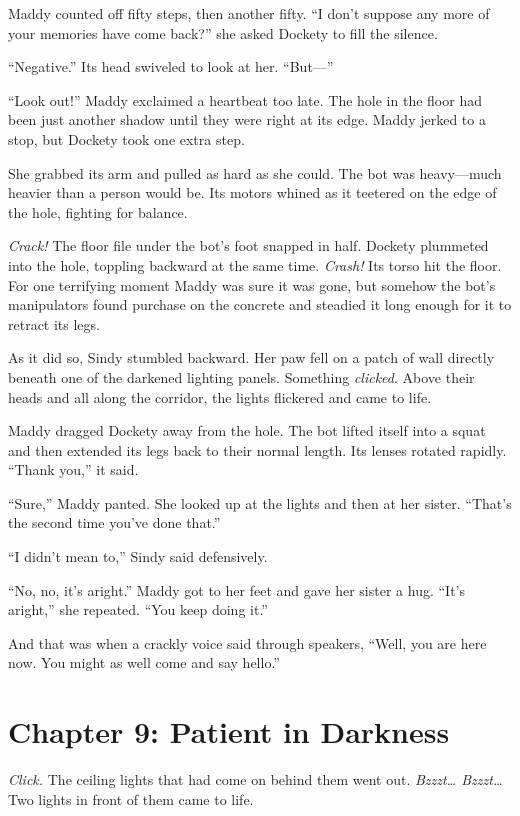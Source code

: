 \documentclass[10pt]{article}
\begin{document}
Maddy counted off fifty steps, then another fifty. ``I don't suppose any
more of your memories have come back?'' she asked Dockety to fill the
silence.

``Negative.'' Its head swiveled to look at her. ``But---''

``Look out!'' Maddy exclaimed a heartbeat too late. The hole in the
floor had been just another shadow until they were right at its edge.
Maddy jerked to a stop, but Dockety took one extra step.

She grabbed its arm and pulled as hard as she could. The bot was
heavy---much heavier than a person would be. Its motors whined as it
teetered on the edge of the hole, fighting for balance.

\emph{Crack!} The floor file under the bot's foot snapped in half.
Dockety plummeted into the hole, toppling backward at the same time.
\emph{Crash!} Its torso hit the floor. For one terrifying moment Maddy
was sure it was gone, but somehow the bot's manipulators found purchase
on the concrete and steadied it long enough for it to retract its legs.

As it did so, Sindy stumbled backward. Her paw fell on a patch of wall
directly beneath one of the darkened lighting panels. Something
\emph{clicked}. Above their heads and all along the corridor, the lights
flickered and came to life.

Maddy dragged Dockety away from the hole. The bot lifted itself into a
squat and then extended its legs back to their normal length. Its lenses
rotated rapidly. ``Thank you,'' it said.

``Sure,'' Maddy panted. She looked up at the lights and then at her
sister. ``That's the second time you've done that.''

``I didn't mean to,'' Sindy said defensively.

``No, no, it's aright.'' Maddy got to her feet and gave her sister a
hug. ``It's aright,'' she repeated. ``You keep doing it.''

And that was when a crackly voice said through speakers, ``Well, you are
here now. You might as well come and say hello.''

\newpage
\section{Chapter 9: Patient in Darkness}

\emph{Click.} The ceiling lights that had come on behind them went out.
\emph{Bzzzt\ldots{} Bzzzt\ldots{}} Two lights in front of them came to
life.
\end{document}
